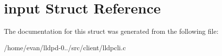 \section{input \-Struct \-Reference}
\label{structinput}


\-The documentation for this struct was generated from the following file\-:\begin{DoxyCompactItemize}
\item 
/home/evan/lldpd-\/0../src/client/lldpcli.\-c\end{DoxyCompactItemize}
